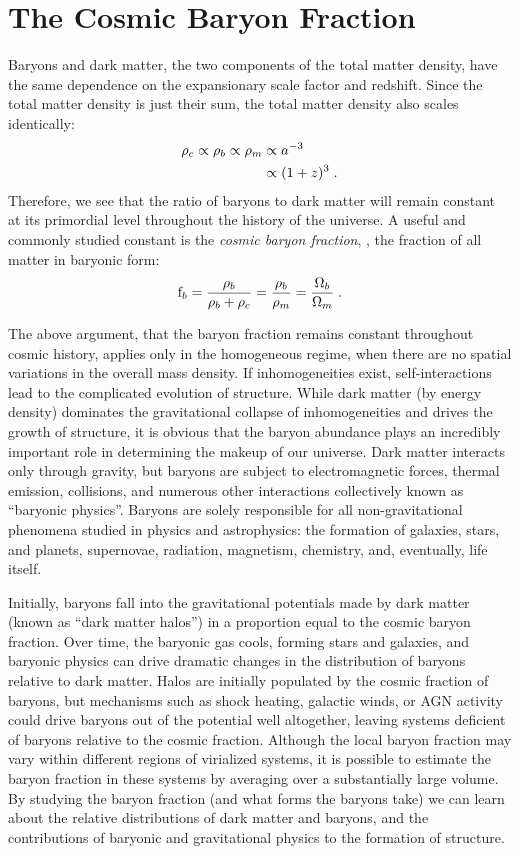 \section{The Cosmic Baryon Fraction}
\label{sec:Intro.Baryons}
Baryons and dark matter, the two components of the total matter
density, have the same dependence on the expansionary scale factor
and redshift. Since the total matter density is just their sum, the
total matter density also scales identically:
\begin{align}
\rho_c \propto \rho_b \propto \rho_m & \propto a^{-3} \nonumber \\
& \propto (1+z)^{3}\;. 
\end{align}
Therefore, we see that the ratio of baryons to dark matter will remain
constant at its primordial level throughout the history of the
universe. A useful and commonly studied constant is the \textit{cosmic
  baryon fraction}, \fb, the fraction of all matter in baryonic form:
\begin{equation}
\textrm{f\ensuremath{_b}} = \frac{\rho_b}{\rho_b + \rho_c} = \frac{\rho_b}{\rho_m} =
\frac{\Omega_b}{\Omega_m}\;.
\end{equation}

The above argument, that the baryon fraction remains constant
throughout cosmic history, applies only in the homogeneous regime,
when there are no spatial variations in the overall mass density. If
inhomogeneities exist, self-interactions lead to the complicated
evolution of structure. While dark matter (by energy density)
dominates the gravitational collapse of inhomogeneities and drives the
growth of structure, it is obvious that the baryon abundance plays
an incredibly important role in determining the makeup of our
universe. Dark matter interacts only through gravity, but baryons are
subject to electromagnetic forces, thermal emission, collisions, and
numerous other interactions collectively known as ``baryonic
physics''. Baryons are solely responsible for all non-gravitational
phenomena studied in physics and astrophysics: the formation of
galaxies, stars, and planets, supernovae, radiation, magnetism,
chemistry, and, eventually, life itself. 

Initially, baryons fall into the gravitational potentials made by dark
matter (known as ``dark matter halos'') in a proportion equal to the
cosmic baryon fraction. Over time, the baryonic gas cools, forming
stars and galaxies, and baryonic physics can drive dramatic changes in
the distribution of baryons relative to dark matter. Halos are
initially populated by the cosmic fraction of baryons, but mechanisms
such as shock heating, galactic winds, or AGN activity could drive
baryons out of the potential well altogether, leaving systems
deficient of baryons relative to the cosmic fraction. Although the
local baryon fraction may vary within different regions of virialized
systems, it is possible to estimate the baryon fraction in these
systems by averaging over a substantially large volume. By studying
the baryon fraction (and what forms the baryons take) we can learn
about the relative distributions of dark matter and baryons, and the
contributions of baryonic and gravitational physics to the formation
of structure.

